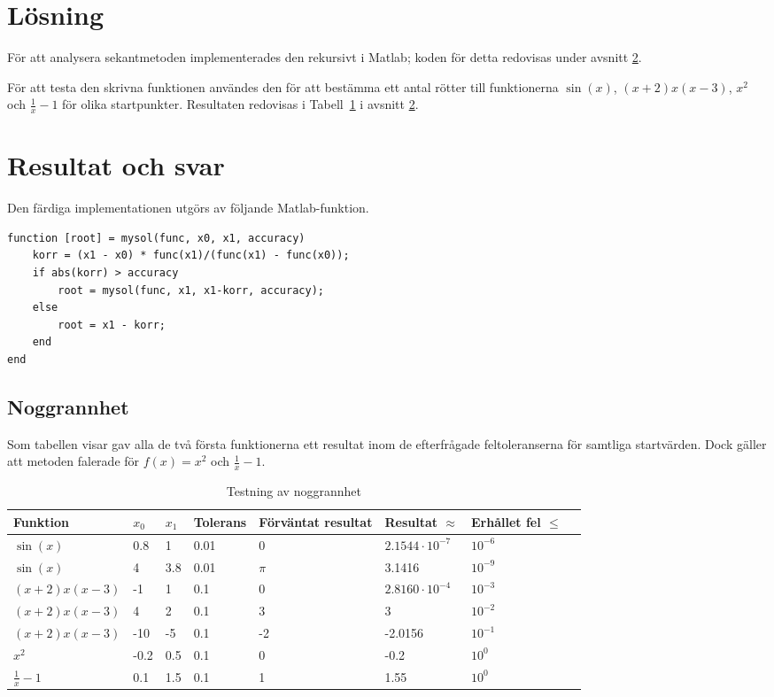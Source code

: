 \documentclass{article}
\begin{document}
\section{Lösning}
För att analysera sekantmetoden implementerades den rekursivt i Matlab; koden för detta redovisas under avsnitt \ref{resultat}. 

För att testa den skrivna funktionen användes den för att bestämma ett antal rötter till funktionerna $\sin(x)$, $ (x+2) x (x-3)$, $x^2$ och $\frac{1}{x} - 1$ för olika startpunkter. Resultaten redovisas i Tabell~\ref{noggrannhet} i avsnitt \ref{resultat}. 

\section{Resultat och svar} \label{resultat}
Den färdiga implementationen utgörs av följande Matlab-funktion.
\begin{lstlisting}
function [root] = mysol(func, x0, x1, accuracy)
    korr = (x1 - x0) * func(x1)/(func(x1) - func(x0));
    if abs(korr) > accuracy
        root = mysol(func, x1, x1-korr, accuracy);
    else
        root = x1 - korr;
    end
end
\end{lstlisting}

\subsection{Noggrannhet}
Som tabellen visar gav alla de två första funktionerna ett resultat inom de efterfrågade feltoleranserna för samtliga startvärden. Dock gäller att metoden falerade för $f(x) = x^2$ och $\frac{1}{x} - 1$.
\begin{table}[H]
  \begin{tabu}{ l l l l X[0.5cm] X l X }
    Funktion & $x_0$ & $x_1$ & Tolerans & Förväntat resultat & Resultat $\approx$ & Erhållet fel $\leq$ \\
    \toprule
    $\sin(x)$ & 0.8 & 1 & 0.01 & 0 & $2.1544 \cdot 10^{-7}$ & $10^{-6}$ \\
    $\sin(x)$ & 4 & 3.8 & 0.01 & $\pi$ & 3.1416 & $10^{-9} $\\
    $ (x+2) x (x-3)$ & -1 & 1 & 0.1 & 0 & $2.8160 \cdot 10^{-4}$ & $10^{-3}$ \\
    $ (x+2) x (x-3)$ & 4 & 2 & 0.1 & 3 & 3 & $10^{-2}$ \\
    $ (x+2) x (x-3)$ & -10 & -5 & 0.1 & -2 & -2.0156 & $10^{-1}$ \\
    $ x^{2}$ & -0.2 & 0.5 & 0.1 & 0 & -0.2  & $10^{0} $ \\
    $ \frac{1}{x} - 1 $ & 0.1 & 1.5 & 0.1 & 1 & 1.55 & $10^{0}$
  \end{tabu}
  \caption{Testning av noggrannhet}\label{noggrannhet}
\end{table}
\end{document}
